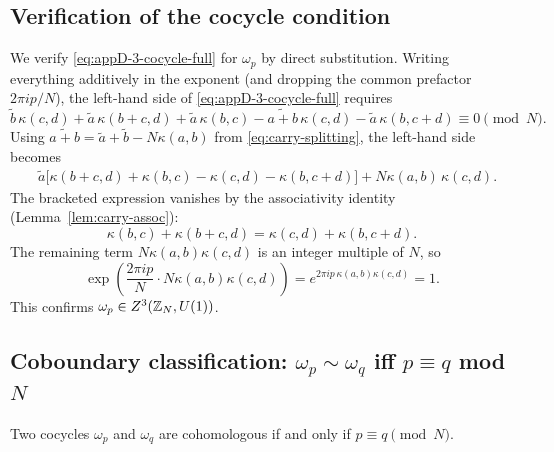 \subsection{Verification of the cocycle condition}

We verify \eqref{eq:appD-3-cocycle-full} for $\omega_p$ by direct substitution. Writing everything additively in the exponent (and dropping the common prefactor $2\pi ip/N$), the left-hand side of \eqref{eq:appD-3-cocycle-full} requires
\begin{equation}\label{eq:appD-cocycle-check}
\widetilde{b}\,\kappa(c,d)+\widetilde{a}\,\kappa(b+c,d)+\widetilde{a}\,\kappa(b,c)-\widetilde{a+b}\,\kappa(c,d)-\widetilde{a}\,\kappa(b,c+d)\equiv 0\pmod{N}.
\end{equation}
Using $\widetilde{a+b}=\widetilde{a}+\widetilde{b}-N\kappa(a,b)$ from \eqref{eq:carry-splitting}, the left-hand side becomes
\begin{align}
&\widetilde{a}\bigl[\kappa(b+c,d)+\kappa(b,c)-\kappa(c,d)-\kappa(b,c+d)\bigr]+N\kappa(a,b)\,\kappa(c,d).\label{eq:appD-cocycle-simplify}
\end{align}
The bracketed expression vanishes by the associativity identity (Lemma~\ref{lem:carry-assoc}):
\begin{equation*}
\kappa(b,c)+\kappa(b+c,d)=\kappa(c,d)+\kappa(b,c+d).
\end{equation*}
The remaining term $N\kappa(a,b)\kappa(c,d)$ is an integer multiple of $N$, so
\begin{equation*}
\exp\!\left(\frac{2\pi ip}{N}\cdot N\kappa(a,b)\kappa(c,d)\right)=e^{2\pi ip\,\kappa(a,b)\kappa(c,d)}=1.
\end{equation*}
This confirms $\omega_p\in Z^3(\mathbb{Z}_N,U(1))$.

\subsection{Coboundary classification: \texorpdfstring{$\omega_p\sim\omega_q$}{omega\_p ~ omega\_q} iff \texorpdfstring{$p\equiv q$}{p=q} mod \texorpdfstring{$N$}{N}}

\begin{proposition}\label{prop:appD-distinct-classes}
Two cocycles $\omega_p$ and $\omega_q$ are cohomologous if and only if $p\equiv q\pmod{N}$.
\end{proposition}

